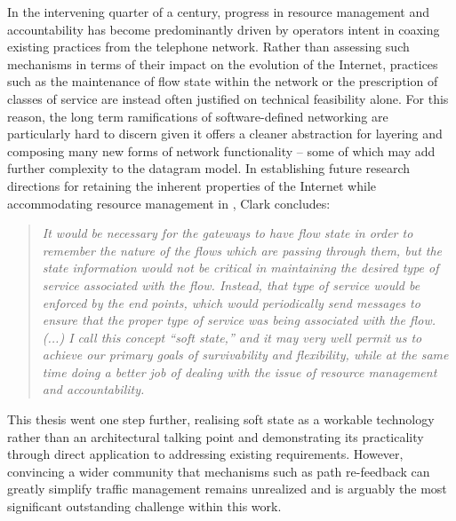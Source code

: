 In the intervening quarter of a century, progress in resource management and accountability has become predominantly driven by operators intent in coaxing existing practices from the telephone network.
Rather than assessing such mechanisms in terms of their impact on the evolution of the Internet, practices such as the maintenance of flow state within the network or the prescription of classes of service are instead often justified on technical feasibility alone.
For this reason, the long term ramifications of software-defined networking are particularly hard to discern given it offers a cleaner abstraction for layering and composing many new forms of network functionality -- some of which may add further complexity to the datagram model.
In establishing future research directions for retaining the inherent properties of the Internet while accommodating resource management in \cite{Clark:1988p478}, Clark concludes:

\begin{quote}
\textit{
It would be necessary for the gateways to have flow state in order to remember the nature of the flows which are passing through them, but the state information would not be critical in maintaining the desired type of service associated with the flow. Instead, that type of service would be enforced by the end points, which would periodically send messages to ensure that the proper type of service was being associated with the flow.
(...)
I call this concept ``soft state,'' and it may very well permit us to achieve our primary goals of survivability and flexibility, while at the same time doing a better job of dealing with the issue of resource management and accountability.
}
\end{quote}

This thesis went one step further, realising soft state as a workable technology rather than an architectural talking point and demonstrating its practicality through direct application to addressing existing requirements.
However, convincing a wider community that mechanisms such as path re-feedback can greatly simplify traffic management remains unrealized and is arguably the most significant outstanding challenge within this work.
